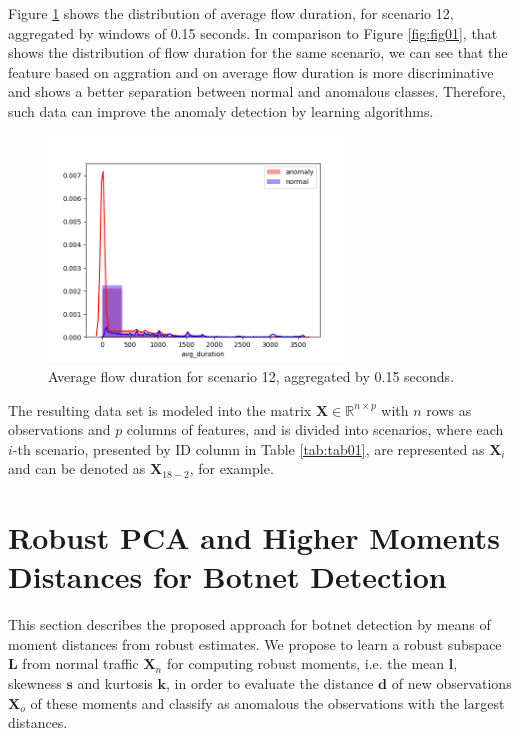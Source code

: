 \documentclass[review]{elsarticle}
\begin{document}
Figure \ref{fig:fig02} shows the distribution of average flow duration, for scenario 12, aggregated by windows of 0.15 seconds. In comparison to Figure \ref{fig:fig01}, that shows the distribution of flow duration for the same scenario, we can see that the feature based on aggration and on average flow duration is more discriminative and shows a better separation between normal and anomalous classes. Therefore, such data can improve the anomaly detection by learning algorithms.

\begin{figure}[h!]
     \centering
     \includegraphics[width=8cm]{figures/agg_distplot_0_15s_12_avg_duration.png}
     \caption{Average flow duration for scenario 12, aggregated by 0.15 seconds.}
     \label{fig:fig02}
\end{figure}

The resulting data set is modeled into the matrix $\boldsymbol{X} \in \mathbb{R}^{n \times p}$ with $n$ rows as observations and $p$ columns of features, and is divided into scenarios, where each $i$-th scenario, presented by ID column in Table \ref{tab:tab01}, are represented as $\boldsymbol{X}_i$ and can be denoted as $\boldsymbol{X}_{18-2}$, for example.

\section{Robust PCA and Higher Moments Distances for Botnet Detection}
\label{sec:m_rpca}

This section describes the proposed approach for botnet detection by means of moment distances from robust estimates. We propose to learn a robust subspace $\textbf{L}$ from normal traffic $\textbf{X}_n$ for computing robust moments, i.e. the mean $\textbf{l}$, skewness $\textbf{s}$ and kurtosis $\textbf{k}$, in order to evaluate the distance $\textbf{d}$ of new observations $\textbf{X}_o$ of these moments and classify as anomalous the observations with the largest distances.
	    
\end{document}

